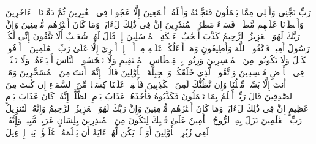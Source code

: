 \startbuffer[\q:26:169]
رَبِّ نَجِّنِی وَأَهۡلِی مِمَّا یَعۡمَلُونَ%
\stopbuffer
\startbuffer[\q:26:170]
فَنَجَّیۡنَٰهُ وَأَهۡلَهُۥۤ أَجۡمَعِینَ%
\stopbuffer
\startbuffer[\q:26:171]
إِلَّا عَجُوزࣰا فِی ٱلۡغَٰبِرِینَ%
\stopbuffer
\startbuffer[\q:26:172]
ثُمَّ دَمَّرۡنَا ٱلۡءَاخَرِینَ%
\stopbuffer
\startbuffer[\q:26:173]
وَأَمۡطَرۡنَا عَلَیۡهِم مَّطَرࣰاۖ فَسَاۤءَ مَطَرُ ٱلۡمُنذَرِینَ%
\stopbuffer
\startbuffer[\q:26:174]
إِنَّ فِی ذَٰلِكَ لَءَایَةࣰۖ وَمَا كَانَ أَكۡثَرُهُم مُّؤۡمِنِینَ%
\stopbuffer
\startbuffer[\q:26:175]
وَإِنَّ رَبَّكَ لَهُوَ ٱلۡعَزِیزُ ٱلرَّحِیمُ%
\stopbuffer
\startbuffer[\q:26:176]
كَذَّبَ أَصۡحَٰبُ لۡءَیۡكَةِ ٱلۡمُرۡسَلِینَ%
\stopbuffer
\startbuffer[\q:26:177]
إِذۡ قَالَ لَهُمۡ شُعَیۡبٌ أَلَا تَتَّقُونَ%
\stopbuffer
\startbuffer[\q:26:178]
إِنِّی لَكُمۡ رَسُولٌ أَمِینࣱ%
\stopbuffer
\startbuffer[\q:26:179]
فَٱتَّقُوا۟ ٱللَّهَ وَأَطِیعُونِ%
\stopbuffer
\startbuffer[\q:26:180]
وَمَاۤ أَسۡءَلُكُمۡ عَلَیۡهِ مِنۡ أَجۡرٍۖ إِنۡ أَجۡرِیَ إِلَّا عَلَىٰ رَبِّ ٱلۡعَٰلَمِینَ%
\stopbuffer
\startbuffer[\q:26:181]
۞ أَوۡفُوا۟ ٱلۡكَیۡلَ وَلَا تَكُونُوا۟ مِنَ ٱلۡمُخۡسِرِینَ%
\stopbuffer
\startbuffer[\q:26:182]
وَزِنُوا۟ بِٱلۡقِسۡطَاسِ ٱلۡمُسۡتَقِیمِ%
\stopbuffer
\startbuffer[\q:26:183]
وَلَا تَبۡخَسُوا۟ ٱلنَّاسَ أَشۡیَاۤءَهُمۡ وَلَا تَعۡثَوۡا۟ فِی ٱلۡأَرۡضِ مُفۡسِدِینَ%
\stopbuffer
\startbuffer[\q:26:184]
وَٱتَّقُوا۟ ٱلَّذِی خَلَقَكُمۡ وَٱلۡجِبِلَّةَ ٱلۡأَوَّلِینَ%
\stopbuffer
\startbuffer[\q:26:185]
قَالُوۤا۟ إِنَّمَاۤ أَنتَ مِنَ ٱلۡمُسَحَّرِینَ%
\stopbuffer
\startbuffer[\q:26:186]
وَمَاۤ أَنتَ إِلَّا بَشَرࣱ مِّثۡلُنَا وَإِن نَّظُنُّكَ لَمِنَ ٱلۡكَٰذِبِینَ%
\stopbuffer
\startbuffer[\q:26:187]
فَأَسۡقِطۡ عَلَیۡنَا كِسَفࣰا مِّنَ ٱلسَّمَاۤءِ إِن كُنتَ مِنَ ٱلصَّٰدِقِینَ%
\stopbuffer
\startbuffer[\q:26:188]
قَالَ رَبِّیۤ أَعۡلَمُ بِمَا تَعۡمَلُونَ%
\stopbuffer
\startbuffer[\q:26:189]
فَكَذَّبُوهُ فَأَخَذَهُمۡ عَذَابُ یَوۡمِ ٱلظُّلَّةِۚ إِنَّهُۥ كَانَ عَذَابَ یَوۡمٍ عَظِیمٍ%
\stopbuffer
\startbuffer[\q:26:190]
إِنَّ فِی ذَٰلِكَ لَءَایَةࣰۖ وَمَا كَانَ أَكۡثَرُهُم مُّؤۡمِنِینَ%
\stopbuffer
\startbuffer[\q:26:191]
وَإِنَّ رَبَّكَ لَهُوَ ٱلۡعَزِیزُ ٱلرَّحِیمُ%
\stopbuffer
\startbuffer[\q:26:192]
وَإِنَّهُۥ لَتَنزِیلُ رَبِّ ٱلۡعَٰلَمِینَ%
\stopbuffer
\startbuffer[\q:26:193]
نَزَلَ بِهِ ٱلرُّوحُ ٱلۡأَمِینُ%
\stopbuffer
\startbuffer[\q:26:194]
عَلَىٰ قَلۡبِكَ لِتَكُونَ مِنَ ٱلۡمُنذِرِینَ%
\stopbuffer
\startbuffer[\q:26:195]
بِلِسَانٍ عَرَبِیࣲّ مُّبِینࣲ%
\stopbuffer
\startbuffer[\q:26:196]
وَإِنَّهُۥ لَفِی زُبُرِ ٱلۡأَوَّلِینَ%
\stopbuffer
\startbuffer[\q:26:197]
أَوَ لَمۡ یَكُن لَّهُمۡ ءَایَةً أَن یَعۡلَمَهُۥ عُلَمَٰۤؤُا۟ بَنِیۤ إِسۡرَٰۤءِیلَ%
\stopbuffer
\startbuffer[\q:26:198]
